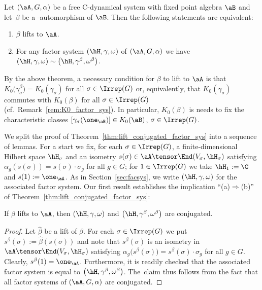 \begin{Theorem}\label{thm:lift_conjugated_factor_sys}
	Let $(\aA, G, \alpha)$ be a free C\Star-dynamical system with fixed point algebra $\aB$ and let~$\beta$ be a \Star-automorphism of $\aB$.
	Then the following statements are equivalent:
	\begin{enumerate}\itemsep=0pt
	\item[$(a)$] $\beta$ lifts to $\aA$.
	\item[$(b)$] For any factor system $(\hH, \gamma, \omega)$ of $(\aA, G, \alpha)$ we have $(\hH, \gamma, \omega) \sim \big(\hH, \gamma^\beta, \omega^\beta\big)$.
	\end{enumerate}
\end{Theorem}
\begin{Remark}
	By the above theorem, a necessary condition for $\beta$ to lift to $\aA$ is that $K_0\big(\gamma_\sigma^\beta\big) = K_0(\gamma_\sigma)$ for all $\sigma \in \Irrep(G)$ or, equivalently, that $K_0(\gamma_\sigma)$ commutes with $K_0(\beta)$ for all $\sigma \in \Irrep(G)$ (cf.~Remark~\ref{rem:K0_factor_sys}).
	In particular, $K_0(\beta)$ is needs to fix the characteristic classes $[\gamma_\sigma(\one_\aB)] \in K_0(\aB)$, $\sigma \in \Irrep(G)$.
\end{Remark}

We split the proof of Theorem~\ref{thm:lift_conjugated_factor_sys} into a sequence of lemmas.
For a start we fix, for each $\sigma \in \Irrep(G)$, a finite-dimensional Hilbert space $\hH_\sigma$ and an isometry $s(\sigma)\in \aA \tensor \End(V_\sigma,\hH_\sigma)$ satisfying $\alpha_g (s(\sigma) )=s(\sigma) \cdot \sigma_g$ for all $g \in G$; for $1 \in \Irrep(G)$ we take $\hH_1 := \C$ and $s(1) := \one_\aA$.
As in Section~\ref{sec:facsys}, we write $(\hH, \gamma, \omega)$ for the associated factor system.
Our first result establishes the implication ``(a)$\Rightarrow$(b)'' of Theorem~\ref{thm:lift_conjugated_factor_sys}:

\begin{Lemma}\label{lem:conjugated}
	If $\beta$ lifts to $\aA$, then $(\hH, \gamma, \omega)$ and $\big(\hH, \gamma^\beta, \omega^\beta\big)$ are conjugated.
\end{Lemma}
\begin{proof}
	Let $\hat \beta$ be a lift of $\beta$.
	For each $\sigma \in \Irrep(G)$ we put $s^\beta(\sigma) := \hat \beta ( s(\sigma) )$ and note that $s^\beta(\sigma)$ is an isometry in $\aA \tensor \End(V_\sigma,\hH_\sigma)$ satisfying $\alpha_g\big(s^\beta(\sigma)\big)=s^\beta(\sigma) \cdot \sigma_g$ for all $g \in G$.
	Clearly, $s^\beta(1) = \one_\aA$.
	Furthermore, it is readily checked that the associated factor system is equal to $\big(\hH, \gamma^\beta, \omega^\beta\big)$.
	The~claim thus follows from the fact that all factor systems of $(\aA, G, \alpha)$ are conjugated.
\end{proof}

